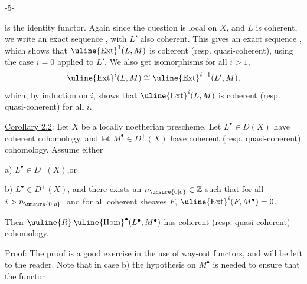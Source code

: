 \begin{center}-5-\end{center}

is the identity functor. Again since the question is local on $X$, and $L$ is coherent, we write an exact sequence
,
with $L'$ also coherent. This gives an exact sequence
,
which shows that $\uline{\operatorname{Ext}}^1(L,M)$ is coherent (resp. quasi-coherent), using the case $i=0$ applied to $L'$. We also get isomorphisms for all $i>1$,
\[
\uline{\operatorname{Ext}}^i(L,M)\cong\uline{\operatorname{Ext}}^{i-1}(L',M),
\]
which, by induction on $i$, shows that $\uline{\operatorname{Ext}}^i(L,M)$ is coherent (resp. quasi-coherent) for all $i$.

\uline{Corollary 2.2}: Let $X$ be a locally noetherian prescheme. Let $L^\bullet\in D(X)$ have coherent cohomology, and let $M^\bullet\in D^+(X)$ have coherent (resp. quasi-coherent) cohomology. Assume either

a) $L^\bullet\in D^-(X)$,\qquad or

b) $L^\bullet\in D^+(X)$, and there exists an $n_{\unsure{0|o}}\in\mathbb Z$ such that for all $i>n_{\unsure{0|o}}$, and for all coherent sheaves $F$, $\uline{\operatorname{Ext}}^i(F,M^\bullet)=0$.

Then $\uuline{R}\,\uline{\operatorname{Hom}}^\bullet(L^\bullet,M^\bullet)$ has coherent (resp. quasi-coherent) cohomology.

\uline{Proof}: The proof is a good exercise in the use of way-out functors, and will be left to the reader. Note that in case b) the hypothesis on $M^\bullet$ is needed to ensure that the functor
